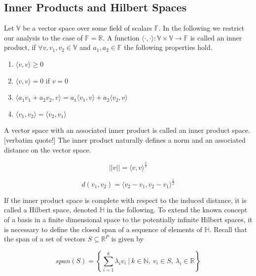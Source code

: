 \documentclass[11pt,twoside,a4paper]{article}
\begin{document}
	\subsection{Inner Products and Hilbert Spaces}
	Let $\mathbb{V}$ be a vector space over some field of scalars $\mathbb{F}$. In the following we restrict our analysis to the case of $\mathbb{F} = \mathbb{R}$. A function $\langle \cdot, \cdot \rangle : \mathbb{V} \times  \mathbb{V} \rightarrow \mathbb{F}$ is called an inner product, if $\forall v, v_1, v_2 \in \mathbb{V}$ and $a_1, a_2 \in \mathbb{F}$ the following properties hold.
	
	\begin{multicols}{2}
		\begin{enumerate}
			\item $\langle v, v \rangle \geq 0$
			\item $\langle v, v \rangle = 0$ if $v = 0$
			\item $\langle a_1 v_1 + a_2 v_2, v \rangle = a_1 \langle v_1, v \rangle + a_2 \langle v_2, v \rangle$
			\item $\langle v_1, v_2 \rangle = \langle v_2, v_1 \rangle$
		\end{enumerate}
	\end{multicols}

	A vector space with an associated inner product is called an inner product space. {\color{red}[verbatim quote!]}
	The inner product naturally defines a norm and an associated distance on the vector space.
	
	\begin{equation}
		\lvert \lvert v \rvert \rvert = {\langle v, v \rangle}^{\frac{1}{2}}
	\end{equation}

	\begin{equation}
		d(v_1, v_2) = {\langle v_2 - v_1, v_2 - v_1 \rangle}^{\frac{1}{2}}
	\end{equation}
	
	If the inner product space is complete with respect to the induced distance, it is called a Hilbert space, denoted $\mathbb{H}$ in the following. To extend the known concept of a basis in a finite dimensional space to the potentially infinite Hilbert spaces, it is necessary to define the closed span of a sequence of elements of $\mathbb{H}$. Recall that the span of a set of vectors $S \subseteq \mathbb{R}^P$ is given by
	
	\begin{equation}
		span(S) = \left\{\sum_{i = 1}^{k} \lambda_i v_i \: \bigg\vert \: k \in \mathbb{N}, \: v_i \in S, \: \lambda_i \in \mathbb{R} \right\}
	\end{equation}
			
\end{document}
